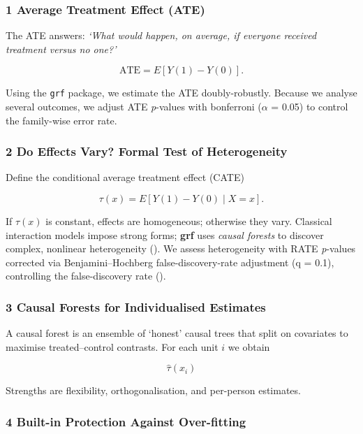\documentclass[
  single column]{article}
\begin{document}
\subsubsection{1 Average Treatment Effect
(ATE)}\label{average-treatment-effect-ate}

The ATE answers: \emph{`What would happen, on average, if everyone
received treatment versus no one?'}

\[
    \text{ATE}=E[Y(1)-Y(0)].
\]

Using the \texttt{grf} package, we estimate the ATE doubly-robustly.
Because we analyse several outcomes, we adjust ATE \emph{p}-values with
bonferroni (\(\alpha\) = 0.05) to control the family-wise error rate.

\subsubsection{2 Do Effects Vary? Formal Test of
Heterogeneity}\label{do-effects-vary-formal-test-of-heterogeneity}

Define the conditional average treatment effect (CATE)

\[
  \tau(x)=E[Y(1)-Y(0)\mid X=x].
\]

If \(\tau(x)\) is constant, effects are homogeneous; otherwise they
vary. Classical interaction models impose strong forms; \textbf{grf}
uses \emph{causal forests} to discover complex, nonlinear heterogeneity
(). We assess
heterogeneity with RATE \emph{p}-values corrected via
Benjamini--Hochberg false-discovery-rate adjustment (q = 0.1),
controlling the false-discovery rate
().

\subsubsection{3 Causal Forests for Individualised
Estimates}\label{causal-forests-for-individualised-estimates}

A causal forest is an ensemble of `honest' causal trees that split on
covariates to maximise treated--control contrasts. For each unit \(i\)
we obtain

\[
  \widehat{\tau}(x_i)
\]

Strengths are flexibility, orthogonalisation, and per-person estimates.

\subsubsection{4 Built-in Protection Against
Over-fitting}\label{built-in-protection-against-over-fitting}
\end{document}

